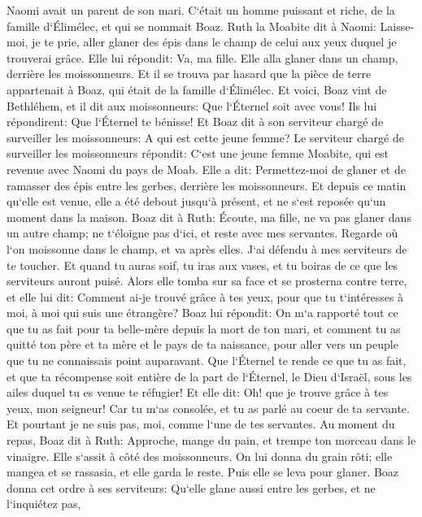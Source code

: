 \verse Naomi avait un parent de son mari. C`était un homme puissant et riche, de la famille d`Élimélec, et qui se nommait Boaz. 
\verse Ruth la Moabite dit à Naomi: Laisse-moi, je te prie, aller glaner des épis dans le champ de celui aux yeux duquel je trouverai grâce. Elle lui répondit: Va, ma fille. 
\verse Elle alla glaner dans un champ, derrière les moissonneurs. Et il se trouva par hasard que la pièce de terre appartenait à Boaz, qui était de la famille d`Élimélec. 
\verse Et voici, Boaz vint de Bethléhem, et il dit aux moissonneurs: Que l`Éternel soit avec vous! Ils lui répondirent: Que l`Éternel te bénisse! 
\verse Et Boaz dit à son serviteur chargé de surveiller les moissonneurs: A qui est cette jeune femme? 
\verse Le serviteur chargé de surveiller les moissonneurs répondit: C`est une jeune femme Moabite, qui est revenue avec Naomi du pays de Moab. 
\verse Elle a dit: Permettez-moi de glaner et de ramasser des épis entre les gerbes, derrière les moissonneurs. Et depuis ce matin qu`elle est venue, elle a été debout jusqu`à présent, et ne s`est reposée qu`un moment dans la maison. 
\verse Boaz dit à Ruth: Écoute, ma fille, ne va pas glaner dans un autre champ; ne t`éloigne pas d`ici, et reste avec mes servantes. 
\verse Regarde où l`on moissonne dans le champ, et va après elles. J`ai défendu à mes serviteurs de te toucher. Et quand tu auras soif, tu iras aux vases, et tu boiras de ce que les serviteurs auront puisé. 
\verse Alors elle tomba sur sa face et se prosterna contre terre, et elle lui dit: Comment ai-je trouvé grâce à tes yeux, pour que tu t`intéresses à moi, à moi qui suis une étrangère? 
\verse Boaz lui répondit: On m`a rapporté tout ce que tu as fait pour ta belle-mère depuis la mort de ton mari, et comment tu as quitté ton père et ta mère et le pays de ta naissance, pour aller vers un peuple que tu ne connaissais point auparavant. 
\verse Que l`Éternel te rende ce que tu as fait, et que ta récompense soit entière de la part de l`Éternel, le Dieu d`Israël, sous les ailes duquel tu es venue te réfugier! 
\verse Et elle dit: Oh! que je trouve grâce à tes yeux, mon seigneur! Car tu m`as consolée, et tu as parlé au coeur de ta servante. Et pourtant je ne suis pas, moi, comme l`une de tes servantes. 
\verse Au moment du repas, Boaz dit à Ruth: Approche, mange du pain, et trempe ton morceau dans le vinaigre. Elle s`assit à côté des moissonneurs. On lui donna du grain rôti; elle mangea et se rassasia, et elle garda le reste. 
\verse Puis elle se leva pour glaner. Boaz donna cet ordre à ses serviteurs: Qu`elle glane aussi entre les gerbes, et ne l`inquiétez pas, 
